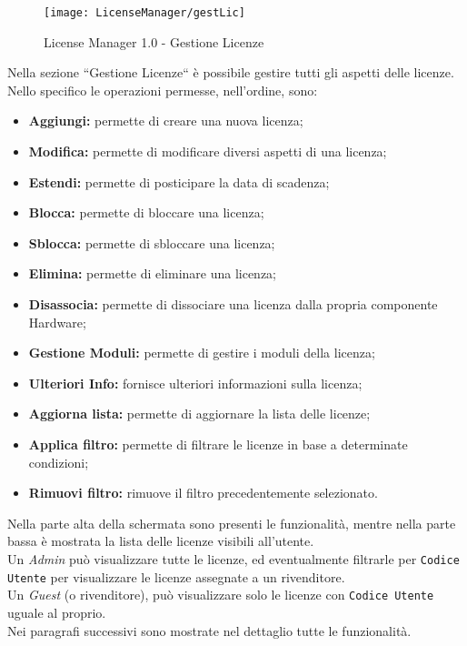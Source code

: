 \begin{figure}[!h] 
    \centering 
    \texttt{[image: LicenseManager/gestLic]} 
    \caption{License Manager 1.0 - Gestione Licenze}
\label{gestLic}
\end{figure}

Nella sezione “Gestione Licenze“ è possibile gestire tutti gli aspetti delle licenze.
Nello specifico le operazioni permesse, nell'ordine, sono:
\begin{itemize}
\item \textbf{Aggiungi:} permette di creare una nuova licenza;
\item \textbf{Modifica:} permette di modificare diversi aspetti di una licenza;
\item \textbf{Estendi:} permette di posticipare la data di scadenza;
\item \textbf{Blocca:} permette di bloccare una licenza;
\item \textbf{Sblocca:} permette di sbloccare una licenza;
\item \textbf{Elimina:} permette di eliminare una licenza;
\item \textbf{Disassocia:} permette di dissociare una licenza dalla propria componente Hardware;
\item \textbf{Gestione Moduli:} permette di gestire i moduli della licenza;
\item \textbf{Ulteriori Info:} fornisce ulteriori informazioni sulla licenza;
\item \textbf{Aggiorna lista:} permette di aggiornare la lista delle licenze;
\item \textbf{Applica filtro:} permette di filtrare le licenze in base a determinate condizioni;
\item \textbf{Rimuovi filtro:} rimuove il filtro precedentemente selezionato.
\end{itemize} 
Nella parte alta della schermata sono presenti le funzionalità, mentre nella parte bassa è mostrata la lista delle licenze visibili all’utente.
\\
Un \textit{Admin} può visualizzare tutte le licenze, ed eventualmente filtrarle per \texttt{Codice Utente} per visualizzare le licenze assegnate a un rivenditore.
\\
Un \textit{Guest} (o rivenditore), può visualizzare solo le licenze con \texttt{Codice Utente} uguale al proprio.
\\
Nei paragrafi successivi sono mostrate nel dettaglio tutte le funzionalità. 

